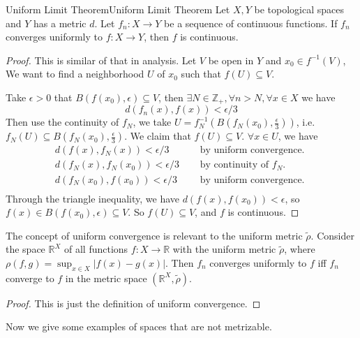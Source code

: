 \documentclass[../main.tex]{subfiles}
\begin{document}
\begin{theorem}{Uniform Limit Theorem}{Uniform Limit Theorem}
Let $X,Y$ be topological spaces and $Y$ has a metric $d$. Let $f_n: X \rightarrow Y$ be a sequence of continuous functions. If $f_n$ converges uniformly to $f: X \rightarrow Y$, then $f$ is continuous.
\end{theorem}
\begin{proof}
This is similar of that in analysis. Let $V$ be open in $Y$ and $x_0\in f^{-1}(V)$, We want to find a neighborhood $U$ of $x_0$ such that $f(U) \subseteq V$.

Take $\epsilon>0$ that $B(f(x_0),\epsilon) \subseteq V$, then $\exists N\in \mathbb{Z}_+, \forall n>N, \forall x\in X$ we have
\begin{equation*}
d(f_n(x),f(x)) < \epsilon / 3
\end{equation*}
Then use the continuity of $f_N$, we take $U = f_N^{-1}(B(f_N(x_0), \frac{\epsilon}{3}))$, i.e. $f_N(U) \subseteq B(f_N(x_0), \frac{\epsilon}{3})$. We claim that $f(U) \subseteq V$. $\forall x\in U$, we have
\begin{equation*}
\begin{aligned}
	d(f(x),f_N(x)) < \epsilon / 3  &\quad\text{ by uniform convergence. } \\
	d(f_N(x),f_N(x_0)) < \epsilon / 3 &\quad\text{ by continuity of $f_N$.}\\
	d(f_N(x_0),f(x_0)) < \epsilon / 3 &\quad\text{ by uniform convergence. } \\
\end{aligned}
\end{equation*}
Through the triangle inequality, we have $d(f(x),f(x_0)) < \epsilon$, so $f(x) \in B(f(x_0),\epsilon) \subseteq V$. So $f(U) \subseteq V$, and $f$ is continuous.
\end{proof}

\begin{remark}
The concept of uniform convergence is relevant to the uniform metric $\tilde{\rho}$. Consider the space $\mathbb{R}^X$ of all functions $f:X \rightarrow \mathbb{R}$ with the uniform metric $\tilde{\rho}$, where $\rho(f,g) = \sup_{x\in X} |f(x)-g(x)|$. Then $f_n$ converges uniformly to $f$ iff $f_n$ converge to $f$ in the metric space $(\mathbb{R}^X,\tilde{\rho})$.
\begin{proof}
This is just the definition of uniform convergence.
\end{proof}
\end{remark}

Now we give some examples of spaces that are not metrizable.
\end{document}
